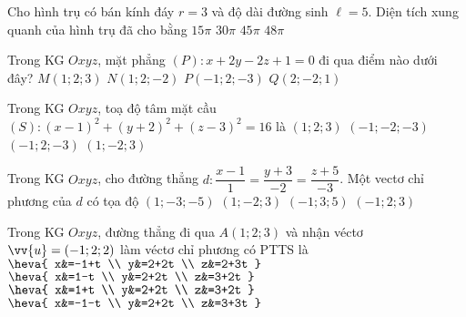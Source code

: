 \begin{ex}%
	Cho hình trụ có bán kính đáy $r=3$ và độ dài đường sinh $\ell=5$. Diện tích xung quanh của hình trụ đã cho bằng
	\choice
	{$15\pi$}
	{\True $30\pi$}
	{$45\pi$}
	{$48\pi$}
\end{ex}	

\begin{ex}%
	Trong KG $Oxyz$, mặt phẳng $(P)\colon x+2y-2z+1=0$ đi qua điểm nào dưới đây?
	\choice
	{\True $M(1;2;3)$}
	{$N(1;2;-2)$}
	{$P(-1;2;-3)$}
	{$Q(2;-2;1)$}
\end{ex}	

\begin{ex}%
	Trong KG $Oxyz$, toạ độ tâm mặt cầu $(S)\colon (x-1)^2+(y+2)^2+(z-3)^2=16$ là
	\choice
	{$(1;2;3)$}
	{$(-1;-2;-3)$}
	{$(-1;2;-3)$}
	{\True $(1;-2;3)$}
\end{ex}

\begin{ex}%
	Trong KG $Oxyz$, cho đường thẳng $d\colon\dfrac{x-1}{1}=\dfrac{y+3}{-2}=\dfrac{z+5}{-3}$. Một vectơ chỉ phương của $d$ có tọa độ
	\choice
	{$(1;-3;-5)$}
	{$(1;-2;3)$}
	{$(-1;3;5)$}
	{\True $(-1;2;3)$}
\end{ex}

\begin{ex}%
	Trong KG $Oxyz$, đường thẳng đi qua $A(1;2;3)$ và nhận véctơ $\vv{u}=(-1;2;2)$ làm véctơ chỉ phương có PTTS là
	\choice
	{$\heva{
			x&=-1+t
			\\
			y&=2+2t
			\\
			z&=2+3t
		}$}
	{\True $\heva{
			x&=1-t
			\\
			y&=2+2t
			\\
			z&=3+2t
		}$}
	{$\heva{
			x&=1+t
			\\
			y&=2+2t
			\\
			z&=3+2t
		}$}
	{$\heva{
			x&=-1-t
			\\
			y&=2+2t
			\\
			z&=3+3t
		}$}
\end{ex}

